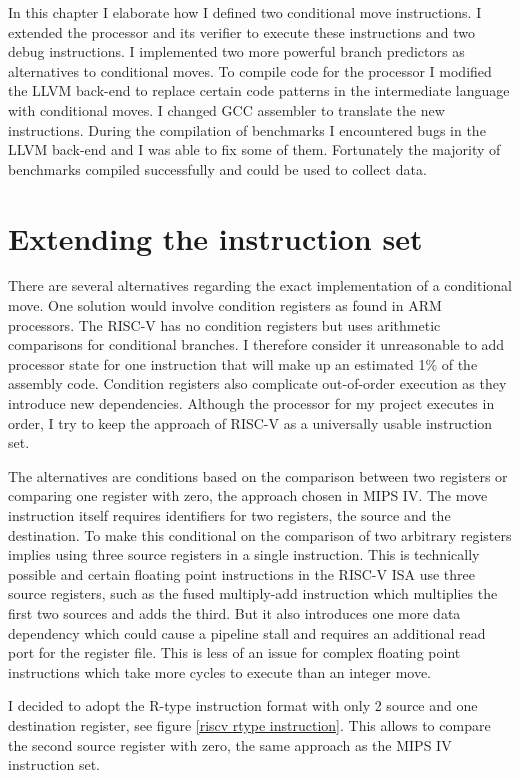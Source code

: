 \documentclass[12pt,twoside,notitlepage]{report}
\begin{document}
In this chapter I elaborate how I defined two conditional move instructions. I extended the processor and its verifier to execute these instructions and two debug instructions. I implemented two more powerful branch predictors as alternatives to conditional moves. To compile code for the processor I modified the LLVM back-end to replace certain code patterns in the intermediate language with conditional moves. I changed GCC assembler to translate the new instructions. During the compilation of benchmarks I encountered bugs in the LLVM back-end and I was able to fix some of them. Fortunately the majority of benchmarks compiled successfully and could be used to collect data.

\section{Extending the instruction set}

There are several alternatives regarding the exact implementation of a conditional move. One solution would involve condition registers as found in ARM processors. The RISC-V has no condition registers but uses arithmetic comparisons for conditional branches\cite[p.~17]{RISCV_MAN}. I therefore consider it unreasonable to add processor state for one instruction that will make up an estimated 1\% of the assembly code. Condition registers also complicate out-of-order execution as they introduce new dependencies. Although the processor for my project executes in order, I try to keep the approach of RISC-V as a universally usable instruction set.

The alternatives are conditions based on the comparison between two registers or comparing one register with zero, the approach chosen in MIPS IV. The move instruction itself requires identifiers for two registers, the source and the destination. To make this conditional on the comparison of two arbitrary registers implies using three source registers in a single instruction. This is technically possible and certain floating point instructions in the RISC-V \gls{ISA} use three source registers, such as the fused multiply-add instruction which multiplies the first two sources and adds the third. But it also introduces one more data dependency which could cause a pipeline stall and requires an additional read port for the register file. This is less of an issue for complex floating point instructions which take more cycles to execute than an integer move.

I decided to adopt the R-type instruction format with only 2 source and one destination register, see figure \ref{riscv rtype instruction}. This allows to compare the second source register with zero, the same approach as the MIPS IV instruction set\cite{MIPSIV}.
\end{document}
